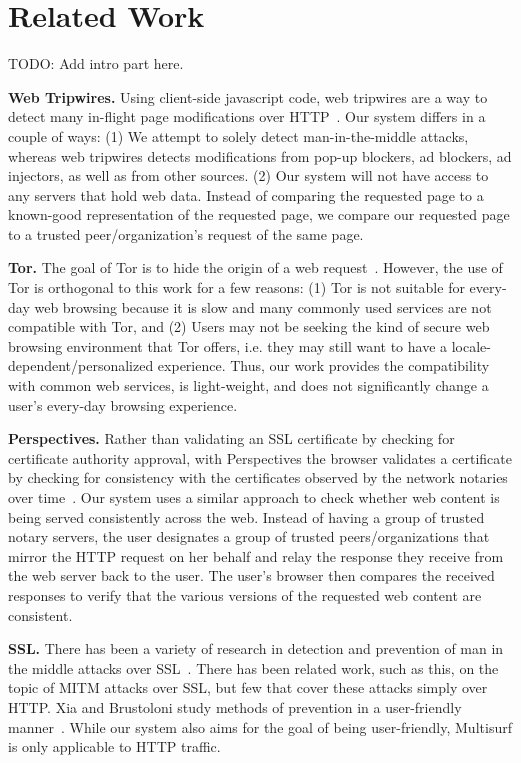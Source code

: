 \section{Related Work}
\label{sec:related}

TODO: Add intro part here.

{\bf Web Tripwires.} Using client-side javascript code, web tripwires are a way to detect many in-flight page modifications over HTTP~\cite{reis2008detecting}.  Our system differs in a couple of ways: (1) We attempt to solely detect man-in-the-middle attacks, whereas web tripwires detects modifications from pop-up blockers, ad blockers, ad injectors, as well as from other sources. (2) Our system will not have access to any servers that hold web data.  Instead of comparing the requested page to a known-good representation of the requested page, we compare our requested page to a trusted peer/organization’s request of the same page. 

{\bf Tor.} The goal of Tor is to hide the origin of a web request~\cite{dingledine2004tor}. However, the use of Tor is orthogonal to this work for a few reasons: (1) Tor is not suitable for every-day web browsing because it is slow and many commonly used services are not compatible with Tor, and (2) Users may not be seeking the kind of secure web browsing environment that Tor offers, i.e. they may still want to have a locale-dependent/personalized experience. Thus, our work provides the compatibility with common web services, is light-weight, and does not significantly change a user’s every-day browsing experience.

{\bf Perspectives.} Rather than validating an SSL certificate by checking for certificate authority approval, with Perspectives the browser validates a certificate by checking for consistency with the certificates observed by the network notaries over time~\cite{wendlandt2008perspectives}. Our system uses a similar approach to check whether web content is being served consistently across the web. Instead of having a group of trusted notary servers, the user designates a group of trusted peers/organizations that mirror the HTTP request on her behalf and relay the response they receive from the web server back to the user. The user’s browser then compares the received responses to verify that the various versions of the requested web content are consistent.             

{\bf SSL.} There has been a variety of research in detection and prevention of man in the middle attacks over SSL~\cite{oppliger2006ssl, callegati2009man, jia2007principle, xia2005hardening, joshi2009mitigating}. There has been related work, such as this, on the topic of MITM attacks over SSL, but few that cover these attacks simply over HTTP.  Xia and Brustoloni study methods of prevention in a user-friendly manner~\cite{xia2005hardening}.  While our system also aims for the goal of being user-friendly, Multisurf is only applicable to HTTP traffic.
